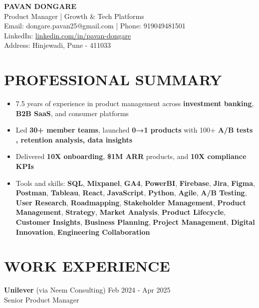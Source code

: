\documentclass[10pt,a4paper]{article}
\newcommand{\experienceitem}[4]{
    #1 \hfill #2 \\
    #3 \hfill \textit{#4}
}
\begin{document}
\vspace*{1\baselineskip} %

\begin{center}
    \textbf{\Large PAVAN DONGARE} \\
    Product Manager | Growth \& Tech Platforms \\
    Email: dongare.pavan25@gmail.com | Phone: 919049481501 \\
    LinkedIn: \href{https://linkedin.com/in/pavan-dongare}{\textcolor{blue!70!black}{linkedin.com/in/pavan-dongare}} \\
    Address: Hinjewadi, Pune - 411033
\end{center}

\section{PROFESSIONAL SUMMARY}
\begin{itemize}[leftmargin=*,itemsep=1pt,topsep=1pt]
    \item 7.5 years of experience in product management across \textbf{investment banking}, \textbf{B2B SaaS}, and consumer platforms
    \item Led \textbf{30+ member teams}, launched \textbf{0→1 products} with 100+ \textbf{A/B tests , retention analysis, data insights}

    \item Delivered \textbf{10X onboarding}, \textbf{\$1M ARR} products, and \textbf{10X compliance KPIs}
   \item Tools and skills: \textbf{SQL}, \textbf{Mixpanel}, \textbf{GA4}, \textbf{PowerBI}, \textbf{Firebase}, \textbf{Jira}, \textbf{Figma}, \textbf{Postman}, \textbf{Tableau}, \textbf{React}, \textbf{JavaScript}, \textbf{Python}, \textbf{Agile}, \textbf{A/B Testing}, \textbf{User Research}, \textbf{Roadmapping}, \textbf{Stakeholder Management}, \textbf{Product Management}, \textbf{Strategy}, \textbf{Market Analysis}, \textbf{Product Lifecycle}, \textbf{Customer Insights}, \textbf{Business Planning}, \textbf{Project Management}, \textbf{Digital Innovation}, \textbf{Engineering Collaboration}

\end{itemize}

\section{WORK EXPERIENCE}

\experienceitem{\textbf{Unilever} (via Neem Consulting)}{Feb 2024 - Apr 2025}{Senior Product Manager}{}
\end{document}
